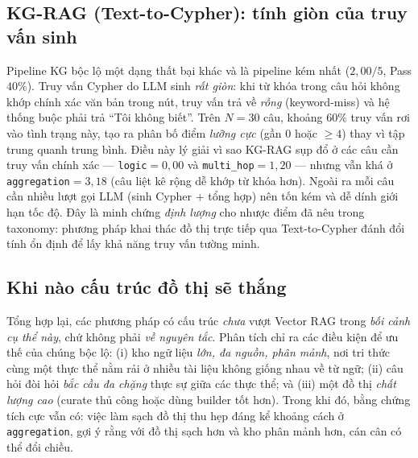 \documentclass[conference]{IEEEtran}
\begin{document}
\subsection{KG-RAG (Text-to-Cypher): tính giòn của truy vấn sinh}
Pipeline KG bộc lộ một dạng thất bại khác và là pipeline kém nhất ($2{,}00/5$, Pass $40\%$). Truy vấn Cypher do LLM sinh \emph{rất giòn}: khi từ khóa trong câu hỏi không khớp chính xác văn bản trong nút, truy vấn trả về \emph{rỗng} (keyword-miss) và hệ thống buộc phải trả ``Tôi không biết''. Trên $N=30$ câu, khoảng $60\%$ truy vấn rơi vào tình trạng này, tạo ra phân bố điểm \emph{lưỡng cực} (gần $0$ hoặc $\geq 4$) thay vì tập trung quanh trung bình. Điều này lý giải vì sao KG-RAG sụp đổ ở các câu cần truy vấn chính xác --- \texttt{logic}$=0{,}00$ và \texttt{multi\_hop}$=1{,}20$ --- nhưng vẫn khá ở \texttt{aggregation}$=3{,}18$ (câu liệt kê rộng dễ khớp từ khóa hơn). Ngoài ra mỗi câu cần nhiều lượt gọi LLM (sinh Cypher + tổng hợp) nên tốn kém và dễ dính giới hạn tốc độ. Đây là minh chứng \emph{định lượng} cho nhược điểm đã nêu trong taxonomy: phương pháp khai thác đồ thị trực tiếp qua Text-to-Cypher đánh đổi tính ổn định để lấy khả năng truy vấn tường minh.

\subsection{Khi nào cấu trúc đồ thị sẽ thắng}
Tổng hợp lại, các phương pháp có cấu trúc \emph{chưa} vượt Vector RAG trong \emph{bối cảnh cụ thể này}, chứ không phải \emph{về nguyên tắc}. Phân tích chỉ ra các điều kiện để ưu thế của chúng bộc lộ: (i) kho ngữ liệu \emph{lớn, đa nguồn, phân mảnh}, nơi tri thức cùng một thực thể nằm rải ở nhiều tài liệu không giống nhau về từ ngữ; (ii) câu hỏi đòi hỏi \emph{bắc cầu đa chặng} thực sự giữa các thực thể; và (iii) một đồ thị \emph{chất lượng cao} (curate thủ công hoặc dùng builder tốt hơn). Trong khi đó, bằng chứng tích cực vẫn có: việc làm sạch đồ thị thu hẹp đáng kể khoảng cách ở \texttt{aggregation}, gợi ý rằng với đồ thị sạch hơn và kho phân mảnh hơn, cán cân có thể đổi chiều.
\end{document}
